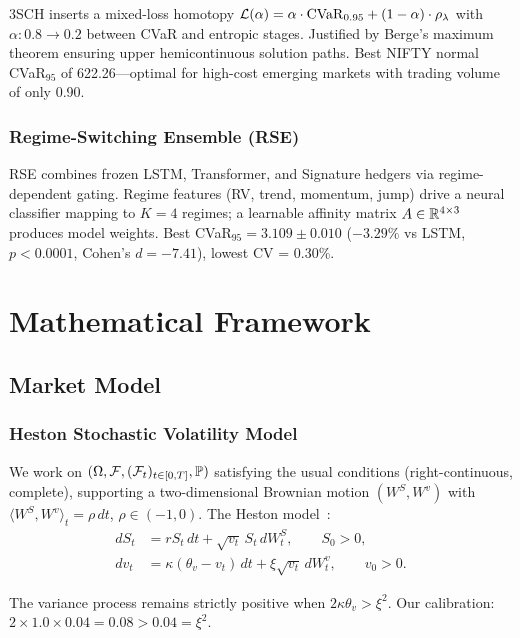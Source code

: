 3SCH inserts a mixed-loss homotopy $\mathcal{L}(\alpha) = \alpha \cdot \mathrm{CVaR}_{0.95} + (1-\alpha) \cdot \rho_\lambda$ with $\alpha: 0.8 \to 0.2$ between CVaR and entropic stages. Justified by Berge's maximum theorem ensuring upper hemicontinuous solution paths. Best NIFTY normal CVaR$_{95}$ of 622.26---optimal for high-cost emerging markets with trading volume of only 0.90.

\subsubsection{Regime-Switching Ensemble (RSE)}

RSE combines frozen LSTM, Transformer, and Signature hedgers via regime-dependent gating. Regime features (RV, trend, momentum, jump) drive a neural classifier mapping to $K=4$ regimes; a learnable affinity matrix $A \in \mathbb{R}^{4 \times 3}$ produces model weights. Best CVaR$_{95} = 3.109 \pm 0.010$ ($-3.29\%$ vs LSTM, $p < 0.0001$, Cohen's $d = -7.41$), lowest CV = 0.30\%.

\section{Mathematical Framework}
\label{sec:math}

\subsection{Market Model}

\subsubsection{Heston Stochastic Volatility Model}

We work on $(\Omega, \mathcal{F}, (\mathcal{F}_t)_{t \in [0,T]}, \mathbb{P})$ satisfying the usual conditions (right-continuous, complete), supporting a two-dimensional Brownian motion $(W^S, W^v)$ with $\langle W^S, W^v \rangle_t = \rho\,dt$, $\rho \in (-1,0)$. The Heston model~\citep{heston1993closed}:
\begin{align}
    dS_t &= r S_t \, dt + \sqrt{v_t}\, S_t \, dW_t^S, \qquad S_0 > 0, \\
    dv_t &= \kappa(\theta_v - v_t) \, dt + \xi \sqrt{v_t} \, dW_t^v, \qquad v_0 > 0.
\end{align}

\begin{remark}
The variance process remains strictly positive when $2\kappa\theta_v > \xi^2$. Our calibration: $2 \times 1.0 \times 0.04 = 0.08 > 0.04 = \xi^2$.
\end{remark}

